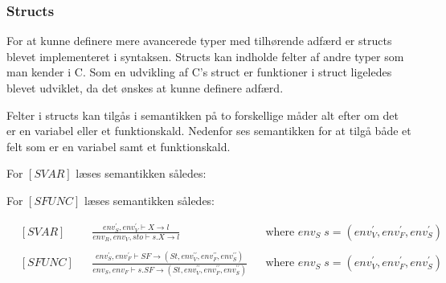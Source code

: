\subsubsection*{Structs}
For at kunne definere mere avancerede typer med tilhørende adfærd er structs blevet implementeret i syntaksen. Structs kan indholde felter af andre typer som man kender i C. Som en udvikling af C's struct er funktioner i struct ligeledes blevet udviklet, da det ønskes at kunne definere adfærd.

Felter i structs kan tilgås i semantikken på to forskellige måder alt efter om det er en variabel eller et funktionskald. Nedenfor ses semantikken for at tilgå både et felt som er en variabel samt et funktionskald.

For $[SVAR]$ læses semantikken således:




For $[SFUNC]$ læses semantikken således:

\begin{align*}
&[SVAR] & &\frac{env_S^\prime, env_V^\prime \vdash X \rightarrow l}{env_R, env_V, sto \vdash s.X \rightarrow l} & &\text{where } env_S\; s = (env_V^\prime, env_F^\prime, env_S^\prime)\\\\
&[SFUNC] & &\frac{env_S^\prime, env_F^\prime \vdash SF \rightarrow (St, env_V^{\prime\prime}, env_F^{\prime\prime}, env_S^{\prime\prime})}{env_S, env_F \vdash s.SF \rightarrow (St, env_V^{\prime\prime}, env_F^{\prime\prime}, env_S^{\prime\prime})} & &\text{where } env_S\; s = (env_V^\prime, env_F^\prime, env_S^\prime)
\end{align*}